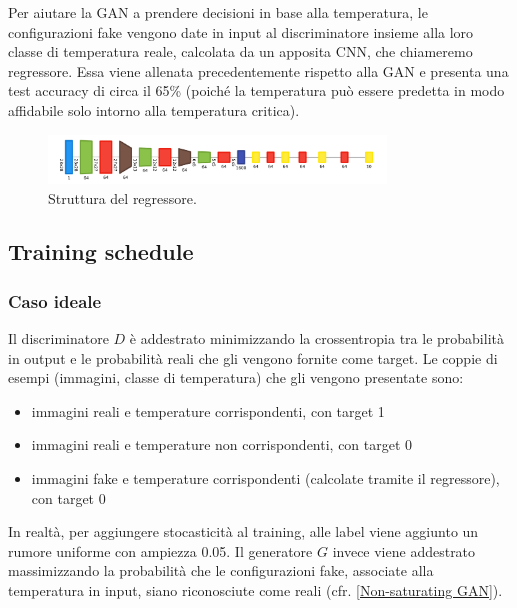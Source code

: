 \documentclass[a4paper]{article}
\begin{document}
Per aiutare la GAN a prendere decisioni in base alla temperatura, le configurazioni fake vengono date in input al discriminatore insieme alla loro classe di temperatura reale, calcolata da un apposita CNN, che chiameremo regressore. Essa viene allenata precedentemente rispetto alla GAN e presenta una test accuracy di circa il 65\% (poiché la temperatura può essere predetta in modo affidabile solo intorno alla temperatura critica).
\begin{figure}[H]
\includegraphics[width=0.8\textwidth]{reg.png}
\centering
\caption{Struttura del regressore.}
\end{figure}
\subsection{Training schedule}
\subsubsection{Caso ideale}
\label{Caso ideale}
Il discriminatore $D$ è addestrato minimizzando la crossentropia tra le probabilità in output e le probabilità reali che gli vengono fornite come target. Le coppie di esempi (immagini, classe di temperatura) che gli vengono presentate sono:
\begin{itemize}
\item immagini reali e temperature corrispondenti, con target 1
\item immagini reali e temperature non corrispondenti, con target 0
\item immagini fake e temperature corrispondenti (calcolate tramite il regressore), con target 0
\end{itemize}
In realtà, per aggiungere stocasticità al training, alle label viene aggiunto un rumore uniforme con ampiezza 0.05.
Il generatore $G$ invece viene addestrato massimizzando la probabilità che le configurazioni fake, associate alla temperatura in input, siano riconosciute come reali (cfr. \ref{Non-saturating GAN}).
\end{document}
